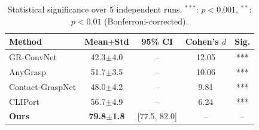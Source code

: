 \begin{table}[t]
\centering
\caption{Statistical significance over 5 independent runs.
$^{***}$: $p<0.001$, $^{**}$: $p<0.01$ (Bonferroni-corrected).}
\label{tab:significance}
\setlength{\tabcolsep}{2.5pt}
\begin{tabular}{@{}lcccc@{}}
\toprule
\textbf{Method} & \textbf{Mean$\pm$Std} & \textbf{95\% CI} & \textbf{Cohen's $d$} & \textbf{Sig.} \\
\midrule
GR-ConvNet & 42.3$\pm$4.0 & -- & 12.05 & *** \\
AnyGrasp & 51.7$\pm$3.5 & -- & 10.06 & *** \\
Contact-GraspNet & 48.0$\pm$4.2 & -- & 9.81 & *** \\
CLIPort & 56.7$\pm$4.9 & -- & 6.24 & *** \\
\midrule
\textbf{Ours} & \textbf{79.8$\pm$1.8} & [77.5, 82.0] & -- & -- \\
\bottomrule
\end{tabular}
\end{table}